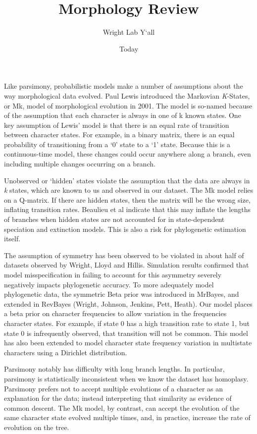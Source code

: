 \documentclass[]{article}
\begin{document}
\title{Morphology Review}
\author{Wright Lab Y`all}
\date{Today}
\maketitle


Like parsimony, probabilistic models make a number of assumptions about the way morphological data evolved. 
Paul Lewis introduced the Markovian \textit{K}-States, or Mk, model of morphological evolution in 2001. 
The model is so-named because of the assumption that each character is always in one of {k} known states.
One key assumption of Lewis' model is that there is an equal rate of transition between character states.
For example, in a binary matrix, there is an equal probability of transitioning from a `0' state to a `1' state.
Because this is a continuous-time model, these changes could occur anywhere along a branch, even including multiple changes occurring on a branch.
\par

Unobserved or `hidden' states violate the assumption that the data are always in \textit{k} states, which are known to us and observed in our dataset.
The Mk model relies on a Q-matrix.
If there are hidden states, then the matrix will be the wrong size, inflating transition rates.
Beaulieu et al indicate that this may inflate the lengths of branches when hidden states are not accounted for in state-dependent speciation and extinction models.
This is also a risk for phylogenetic estimation itself. \par

The assumption of symmetry has been observed to be violated in about half of datasets observed by Wright, Lloyd and Hillis.
Simulation results confirmed that model misspecification in failing to account for this asymmetry severely negatively impacts phylogenetic accuracy.
To more adequately model phylogenetic data, the symmetric Beta prior was introduced in MrBayes, and extended in RevBayes (Wright, Johnson, Jenkins, Pett, Heath).
Our model places a beta prior on character frequencies to allow variation in the frequencies character states.
For example, if state 0 has a high transition rate to state 1, but state 0 is infrequently observed, that transition will not be common.
This model has also been extended to model character state frequency variation in multistate characters using a Dirichlet distribution. \par


Parsimony notably has difficulty with long branch lengths.
In particular, parsimony is statistically inconsistent when we know the dataset has homoplasy.
Parsimony prefers not to accept multiple evolutions of a character as an explanation for the data; instead interpreting that similarity as evidence of common descent. 
The Mk model, by contrast, can accept the evolution of the same character state evolved multiple times, and, in practice, increase the rate of evolution on the tree. \par


 
\end{document}
